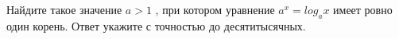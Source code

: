 
Найдите такое значение $a > 1$ , при котором уравнение $a^x=log_ax$ имеет ровно один корень. Ответ укажите с точностью до десятитысячных.

\soultionSection

